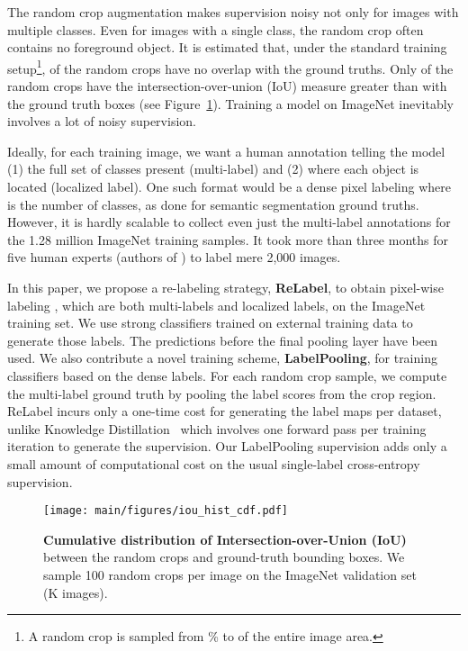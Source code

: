 \documentclass[final]{cvpr}
\newcommand\ours{{{\mbox{ReLabel}}}\xspace}
\newcommand\oursb{{\textbf{\mbox{ReLabel}}}\xspace}
\newcommand\ourframework{{{LabelPooling}}\xspace}
\newcommand\ourframeworkb{{\textbf{{LabelPooling}}}\xspace}
\begin{document}
The random crop augmentation makes supervision noisy not only for images with multiple classes. Even for images with a single class, the random crop often contains no foreground object. It is estimated that, under the standard training setup\footnote{A random crop is sampled from \% to  of the entire image area.},  of the random crops have no overlap with the ground truths. Only  of the random crops have the intersection-over-union (IoU) measure greater than  with the ground truth boxes (see Figure~\ref{fig:rrc_overlap}). Training a model on ImageNet inevitably involves a lot of noisy supervision.

Ideally, for each training image, we want a human annotation telling the model (1) the full set of classes present (multi-label) and (2) where each object is located (localized label). One such format would be a dense pixel labeling  where  is the number of classes, as done for semantic segmentation ground truths. However, it is hardly scalable to collect even just the multi-label annotations for the 1.28 million ImageNet training samples. It took more than three months for five human experts (authors of \cite{shanker2020machine_accuracy}) to label mere 2,000 images.

In this paper, we propose a re-labeling strategy, \oursb, to obtain pixel-wise labeling , which are both multi-labels and localized labels, on the ImageNet training set. We use strong classifiers trained on external training data to generate those labels. The predictions before the final pooling layer have been used.
We also contribute a novel training scheme, \ourframeworkb, for training classifiers based on the dense labels. For each random crop sample, we compute the multi-label ground truth by pooling the label scores from the crop region.
\ours incurs only a one-time cost for generating the label maps per dataset, unlike \eg Knowledge Distillation~\cite{hinton2015distilling} which involves one forward pass per training iteration to generate the supervision. Our \ourframework supervision adds only a small amount of computational cost on the usual single-label cross-entropy supervision.


\begin{figure}[t]
\centering
\texttt{[image: main/figures/iou\_hist\_cdf.pdf]}
\caption{\textbf{Cumulative distribution of Intersection-over-Union (IoU)} between the random crops and ground-truth bounding boxes. We sample 100 random crops per image on the ImageNet validation set (K images).
}
\label{fig:rrc_overlap}
\vspace{-0.2cm}
\end{figure}
\end{document}

